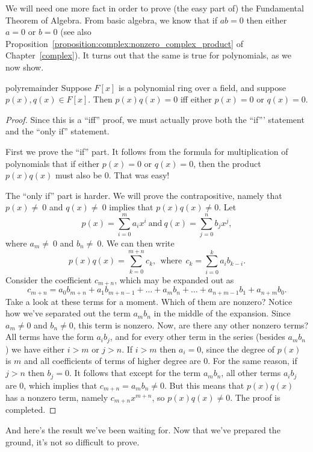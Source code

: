 We will need one more fact in order to prove (the easy part of) the Fundamental Theorem of Algebra. From basic algebra, we know that if $ab=0$ then either $a=0$ or $b=0$ (see also 
Proposition~\ref{proposition:complex:nonzero_complex_product} of Chapter~\ref{complex}).  It turns out that the same is true for polynomials, as we now show.

\begin{prop}{polyremainder}
Suppose $F[x]$ is a polynomial ring over a field, and suppose $p(x),  q(x) \in F[x]$. Then $p(x)  q(x)=0$ iff either $p(x)=0$ or $q(x)=0$.
\end {prop}
\begin{proof}
Since this is a ``iff'' proof, we must actually prove both the ``if''' statement and the ``only if'' statement.  

First we prove the ``if'' part.  It follows from  the formula for multiplication of polynomials that if either $p(x)=0$ or $q(x)=0$, then the product $p(x)q(x)$ must also be 0. That was easy!

The ``only if'' part is harder. We will prove the contrapositive, namely that  $p(x)\neq\ 0$ and  $ q(x)\neq\ 0$ implies that  $p(x)q(x) \neq 0$.
Let 
\[p(x) =  \sum_{i=0}^{m} a_i x^i \mathrm{~ and ~} q(x) =  \sum_{j=0}^{n} b_j x^j, \] 
where $a_m \neq\ 0$ and $b_n\neq\ 0$.
We can then write
 \[p(x) q(x) = \sum_{k=0}^{m+n} c_k, \mathrm{~~where~~} c_{k} =  \sum_{i=0}^{k}a_i b_{k-i}.\]
Consider the coefficient $c_{m+n}$, which may be expanded out as
\[
c_{m+n} =  a_0 b_{m+n} + a_1 b_{m+n-1} + \ldots  + a_{m}b_{n} + \dots +  a_{n+m-1}b_{1} + a_{n+m}b_{0}.
\]
Take a look at these terms for a moment. Which of them are nonzero?  Notice how we've separated out the term $a_{m}b_{n}$ in the middle of the expansion. Since $a_{m} \neq 0$ and $b_{n} \neq 0$, this term is nonzero. Now, are there
any other nonzero terms?  All terms have the  form $a_i b_j$, and for every other term in the series (besides $a_{m}b_{n}$) we have either $i>m$ or $j>n$.  If $i>m$ then $a_i=0$, since the degree of $p(x)$ is $m$ and all coefficients of terms of higher degree are 0.  For the same reason, if $j>n$ then $b_j=0$. It follows that except for the term $a_{m}b_{n}$, all other terms $a_ib_j$ are 0, which implies that $c_{m+n} = a_mb_n \neq 0$. But this means that $p(x)q(x)$ has a nonzero term, namely
$c_{m+n}x^{m+n}$, so $p(x)q(x) \neq 0$.    The proof is completed.
\end{proof}

And here's the result we've been waiting for. Now that we've prepared the ground, it's not so difficult to prove.

